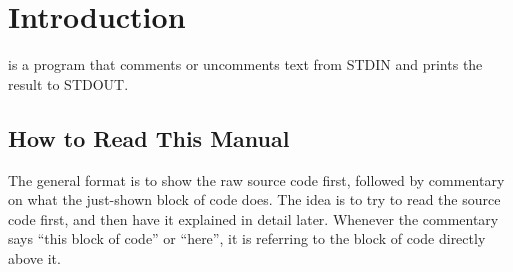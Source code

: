 \section{Introduction}

 is a program that comments or uncomments text from STDIN and prints the result to STDOUT.

\subsection{How to Read This Manual}

The general format is to show the raw source code first, followed by commentary on what the just-shown block of code does.
The idea is to try to read the source code first, and then have it explained in detail later.
Whenever the commentary says ``this block of code'' or ``here'', it is referring to the block of code directly above it.
